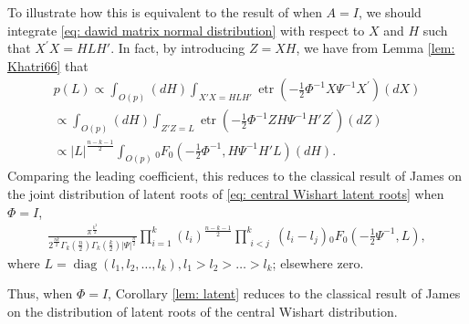 \documentclass{amsart}
\theoremstyle{definition}
\numberwithin{equation}{section}
\begin{document}
To illustrate how this is equivalent to the result of \cite{james1960distribution} when $ A =  I$, we should integrate \eqref{eq: dawid matrix normal distribution} with respect to $X$ and $H$ such that $ X^{\prime} X= H  L  H'$. In fact, by introducing $ Z =  X  H$, we have from Lemma \ref{lem: Khatri66} that
\begin{equation*}   \begin{aligned}
    p( L) \propto \int_{O(p)} (d H) \int_{ X'  X = H L H'} \operatorname{etr} \left( -\frac{1}{2}  \varPhi^{-1}{X} \varPsi^{-1}{X}^{\prime} \right)(d X)\\
   \propto \int_{O(p)} (d H) \int_{ Z'  Z = L } \operatorname{etr} \left( -\frac{1}{2}  \varPhi^{-1}{Z} H \varPsi^{-1} H'{Z}^{\prime} \right) (d Z)\\
    \propto | L|^{\frac{n-k-1}{2}}\int_{O(p)}   {}_0F_0\left( -\frac{1}{2}  \varPhi^{-1}, H \varPsi^{-1} H' L\right) (d H).\end{aligned}\end{equation*}
Comparing the leading coefficient, this reduces to the classical result of James on the joint distribution of latent roots of \eqref{eq: central Wishart latent roots} when $ \varPhi =  I$,
\begin{eqnarray}
          \frac{\pi^{\frac{k^{2}}{2}}}{2^{\frac{nk}{2}}\varGamma_{k}(\frac{n}{2})\varGamma_{k}(\frac{k}{2})| \varPsi|^{\frac{n}{2}}} \prod_{i=1}^{k}(l_i)^{\frac{n-k-1}{2}}\prod_{\substack{i<j}}^{k} (l_{i} - l_{j}) {}_0F_{0}\left(-\frac{1}{2} \varPsi^{-1},  L\right), \label{eq: central Wishart latent roots}%
\end{eqnarray}
where $ L = \operatorname{diag}(l_{1},l_{2},\dots,l_{k}), l_{1}>l_{2}>\dots > l_{k}$; elsewhere zero. 

Thus, when $\varPhi =  I$, Corollary \ref{lem: latent} reduces to the classical result of James on the distribution of latent roots of the central Wishart distribution.




\end{document}
